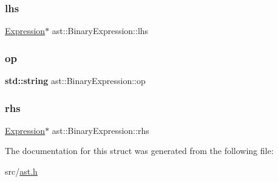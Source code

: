 \subsubsection{\texorpdfstring{lhs}{lhs}}
{\footnotesize\ttfamily \hyperlink{structast_1_1_expression}{Expression}$\ast$ ast\+::\+Binary\+Expression\+::lhs}

\mbox{\label{structast_1_1_binary_expression_a7621248e9b4f08d2987b86758a832801}} 
\subsubsection{\texorpdfstring{op}{op}}
{\footnotesize\ttfamily \textbf{ std\+::string} ast\+::\+Binary\+Expression\+::op}

\mbox{\label{structast_1_1_binary_expression_a9f298035c5a0f9169ba7c10f2ce1722a}} 
\subsubsection{\texorpdfstring{rhs}{rhs}}
{\footnotesize\ttfamily \hyperlink{structast_1_1_expression}{Expression}$\ast$ ast\+::\+Binary\+Expression\+::rhs}



The documentation for this struct was generated from the following file\+:\begin{DoxyCompactItemize}
\item 
src/\hyperlink{ast_8h}{ast.\+h}\end{DoxyCompactItemize}
